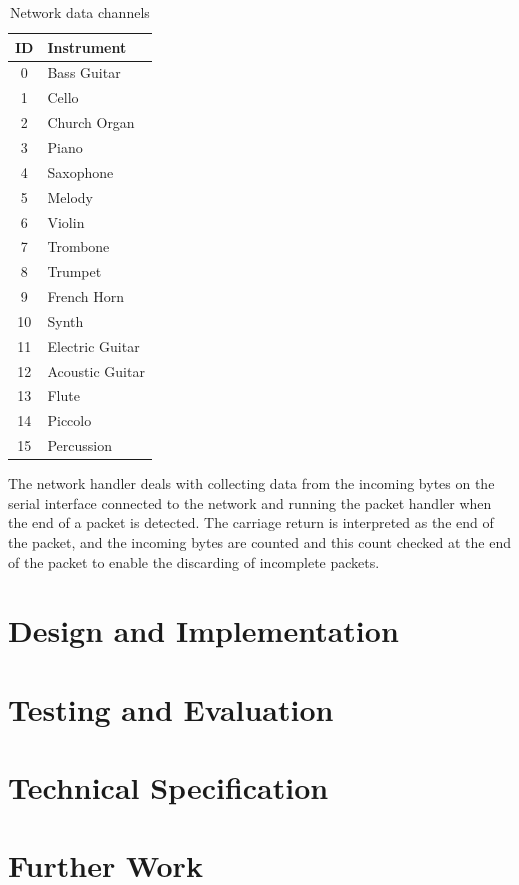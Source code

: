 \documentclass[a4paper,10pt]{article}
\begin{document}
\begin{table}[htbp]
\centering
\begin{tabular}[bp]{c l}
ID & Instrument \\
\hline
0 & Bass Guitar \\
1 & Cello \\
2 & Church Organ \\
3 & Piano \\
4 & Saxophone \\
5 & Melody \\
6 & Violin \\
7 & Trombone \\
8 & Trumpet \\
9 & French Horn \\
10 & Synth \\
11 & Electric Guitar \\
12 & Acoustic Guitar \\
13 & Flute \\
14 & Piccolo \\
15 & Percussion
\end{tabular}
\caption{Network data channels}\label{tab:channelids}
\end{table}

The network handler deals with collecting data from the incoming bytes on the serial interface 
connected to the network and running the packet handler when the end of a packet is detected.  The 
carriage return is interpreted as the end of the packet, and the incoming bytes are counted and this 
count checked at the end of the packet to enable the discarding of incomplete packets.  

\pagebreak
\section{Design and Implementation}

\pagebreak
\section{Testing and Evaluation}

\pagebreak
\section{Technical Specification}

\pagebreak
\section{Further Work}


\appendix

\pagebreak
\begin{thebibliography}{99}
\end{thebibliography}
\end{document}
